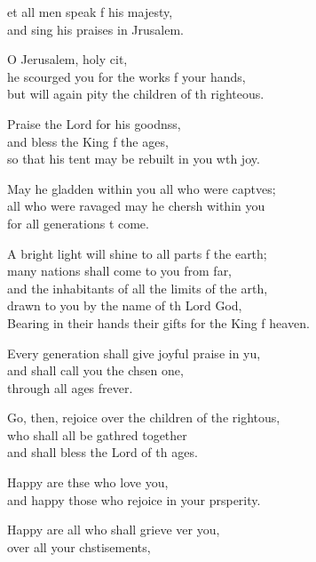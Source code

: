 \settowidth{\versewidth}{Bearing in their hands their gifts for the King of heaven.}
\begin{psalmverse}%
  \begin{patverse}
et all men speak f his majesty,\Med\\
and sing his praises in Jrusalem.

O Jerusalem, holy cit,\Flex\\
he scourged you for the works f your hands,\Med\\
but will again pity the children of th righteous.

Praise the Lord for his goodnss,\Flex\\
and bless the King f the ages,\Med\\
so that his tent may be rebuilt in you w\pointup{\i}th joy.

May he gladden within you all who were capt\pointup{\i}ves;\Flex\\
all who were ravaged may he cher\pointup{\i}sh within you\Med\\
for all generations t come.

A bright light will shine to all parts f the earth;\Med\\
many nations shall come to you from far,\\
and the inhabitants of all the limits of the arth,\Flex\\
drawn to you by the name of th Lord God,\Med\\
Bearing in their hands their gifts for the King f heaven.

Every generation shall give joyful praise in yu,\Flex\\
and shall call you the chsen one,\Med\\
through all ages frever.

Go, then, rejoice over the children of the rightous,\Flex\\
who shall all be gathred together\Med\\
and shall bless the Lord of th ages.

Happy are thse who love you,\Med\\
and happy those who rejoice in your prsperity.

Happy are all who shall grieve ver you,\Med\\
over all your chstisements,


\end{patverse}
\end{psalmverse}
